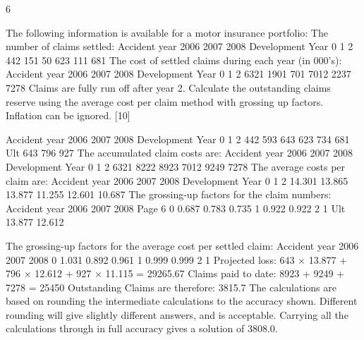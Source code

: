 6

The following information is available for a motor insurance portfolio:
The number of claims settled:
Accident year
2006
2007
2008
Development Year
0
1
2
442
151
50
623
111
681
The cost of settled claims during each year (in 000’s):
Accident year
2006
2007
2008
Development Year
0
1
2
6321
1901
701
7012
2237
7278
Claims are fully run off after year 2. Calculate the outstanding claims reserve using
the average cost per claim method with grossing up factors. Inflation can be ignored.
[10]

Accident year
2006
2007
2008
Development Year
0
1
2
442
593
643
623
734
681
Ult
643
796
927
The accumulated claim costs are:
Accident year
2006
2007
2008
Development Year
0
1
2
6321
8222
8923
7012
9249
7278
The average costs per claim are:
Accident year
2006
2007
2008
Development Year
0
1
2
14.301 13.865 13.877
11.255 12.601
10.687
The grossing-up factors for the claim numbers:
Accident year
2006
2007
2008
Page 6
0
0.687
0.783
0.735
1
0.922
0.922
2
1
Ult
13.877
12.612


The grossing-up factors for the average cost per settled claim:
Accident year
2006
2007
2008
0
1.031
0.892
0.961
1
0.999
0.999
2
1
Projected loss: 643 × 13.877 + 796 × 12.612 + 927 × 11.115 = 29265.67
Claims paid to date: 8923 + 9249 + 7278 = 25450
Outstanding Claims are therefore: 3815.7
The calculations are based on rounding the intermediate calculations to the accuracy
shown. Different rounding will give slightly different answers, and is acceptable.
Carrying all the calculations through in full accuracy gives a solution of 3808.0.
